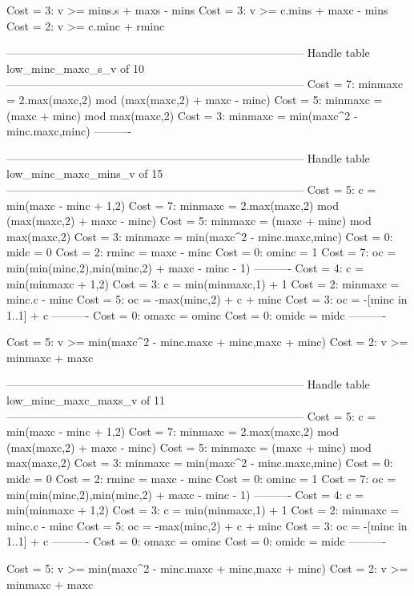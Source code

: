 Cost =  3:  v >= mins.s + maxs - mins
Cost =  3:  v >= c.mins + maxc - mins
Cost =  2:  v >= c.minc + rminc

--------------------------------------------------------------------------------
Handle table low_minc_maxc_s_v of 10
--------------------------------------------------------------------------------
Cost =  7:  minmaxc = 2.max(maxc,2) mod (max(maxc,2) + maxc - minc)
Cost =  5:  minmaxc = (maxc + minc) mod max(maxc,2)
Cost =  3:  minmaxc = min(maxc^2 - minc.maxc,minc)
----------


--------------------------------------------------------------------------------
Handle table low_minc_maxc_mins_v of 15
--------------------------------------------------------------------------------
Cost =  5:  c       = min(maxc - minc + 1,2)
Cost =  7:  minmaxc = 2.max(maxc,2) mod (max(maxc,2) + maxc - minc)
Cost =  5:  minmaxc = (maxc + minc) mod max(maxc,2)
Cost =  3:  minmaxc = min(maxc^2 - minc.maxc,minc)
Cost =  0:  midc    = 0
Cost =  2:  rminc   = maxc - minc
Cost =  0:  ominc   = 1
Cost =  7:  oc      = min(min(minc,2),min(minc,2) + maxc - minc - 1)
----------
Cost =  4:  c       = min(minmaxc + 1,2)
Cost =  3:  c       = min(minmaxc,1) + 1
Cost =  2:  minmaxc = minc.c - minc
Cost =  5:  oc      = -max(minc,2) + c + minc
Cost =  3:  oc      = -[minc in 1..1] + c
----------
Cost =  0:  omaxc   = ominc
Cost =  0:  omidc   = midc
----------

Cost =  5:  v >= min(maxc^2 - minc.maxc + minc,maxc + minc)
Cost =  2:  v >= minmaxc + maxc

--------------------------------------------------------------------------------
Handle table low_minc_maxc_maxs_v of 11
--------------------------------------------------------------------------------
Cost =  5:  c       = min(maxc - minc + 1,2)
Cost =  7:  minmaxc = 2.max(maxc,2) mod (max(maxc,2) + maxc - minc)
Cost =  5:  minmaxc = (maxc + minc) mod max(maxc,2)
Cost =  3:  minmaxc = min(maxc^2 - minc.maxc,minc)
Cost =  0:  midc    = 0
Cost =  2:  rminc   = maxc - minc
Cost =  0:  ominc   = 1
Cost =  7:  oc      = min(min(minc,2),min(minc,2) + maxc - minc - 1)
----------
Cost =  4:  c       = min(minmaxc + 1,2)
Cost =  3:  c       = min(minmaxc,1) + 1
Cost =  2:  minmaxc = minc.c - minc
Cost =  5:  oc      = -max(minc,2) + c + minc
Cost =  3:  oc      = -[minc in 1..1] + c
----------
Cost =  0:  omaxc   = ominc
Cost =  0:  omidc   = midc
----------

Cost =  5:  v >= min(maxc^2 - minc.maxc + minc,maxc + minc)
Cost =  2:  v >= minmaxc + maxc

